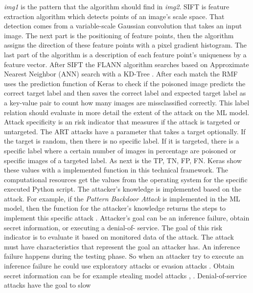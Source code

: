 \textit{img1} is the pattern that the algorithm should find in \textit{img2}. SIFT is feature extraction algorithm which detects points of an image's scale space. That detection comes from a variable-scale Gaussian convolution that takes an input image. The next part is the positioning of feature points, then the algorithm assigns the direction of these feature points with a pixel gradient histogram. The last part of the algorithm is a description of each feature point's uniqueness by a feature vector. After SIFT the FLANN algorithm searches based on Approximate Nearest Neighbor (ANN) search \cite{DBLP:journals/pami/MujaL14} with a KD-Tree \cite{DBLP:journals/cacm/Bentley75}. After each match the RMF uses the prediction function of Keras to check if the poisoned image predicts the correct target label and then saves the correct label and expected target label as a key-value pair to count how many images are missclassified correctly. This label relation should evaluate in more detail the extent of the attack on the ML model. \\
Attack specificity is an risk indicator that measures if the attack is targeted or untargeted. The ART attacks have a parameter that takes a target optionally. If the target is random, then there is no specific label. If it is targeted, there is a specific label where a certain number of images in percentage are poisoned or specific images of a targeted label. As next is the TP, TN, FP, FN. Keras show these values with a
implemented function in this technical framework. The computational resources get the values from the operating system for the specific executed Python script. The attacker's knowledge is
implemented based on the attack. For example, if the \textit{Pattern Backdoor Attack} is implemented in the ML model, then the function for the attacker's knowledge returns the steps to
implement this specific attack \cite{bsi_2013}. Attacker's goal \cite{DBLP:journals/corr/abs-2012-04884} can be an inference failure, obtain secret information, or executing a denial-of-
service. The goal of this risk indicator is to evaluate it based on monitored data of the attack. The attack must have characteristics that represent the goal an attacker has. An
inference failure happens during the testing phase. So when an attacker try to execute an inference failure he could use exploratory attacks \cite{tabassi2019taxonomy} or evasion attacks \cite{DBLP:conf/sp/Carlini017}. Obtain secret information can be for example stealing model attacks \cite{DBLP:journals/corr/abs-2105-00623}, \cite{DBLP:journals/wicomm/ZhangLGQTZ20}. Denial-of-service attacks have the goal to slow
